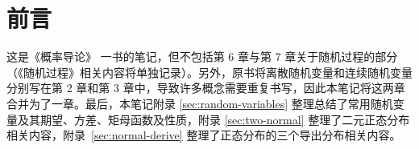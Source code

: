 \section*{前言}

这是《概率导论》\cite{bertsekas2008introduction} 一书的笔记，但不包括第 6 章与第 7 章关于随机过程的部分（《随机过程》相关内容将单独记录）。另外，原书将离散随机变量和连续随机变量分别写在第 2 章和第 3 章中，导致许多概念需要重复书写，因此本笔记将这两章合并为了一章。最后，本笔记附录 \ref{sec:random-variables} 整理总结了常用随机变量及其期望、方差、矩母函数及性质，附录 \ref{sec:two-normal} 整理了二元正态分布相关内容，附录~\ref{sec:normal-derive} 整理了正态分布的三个导出分布相关内容。

